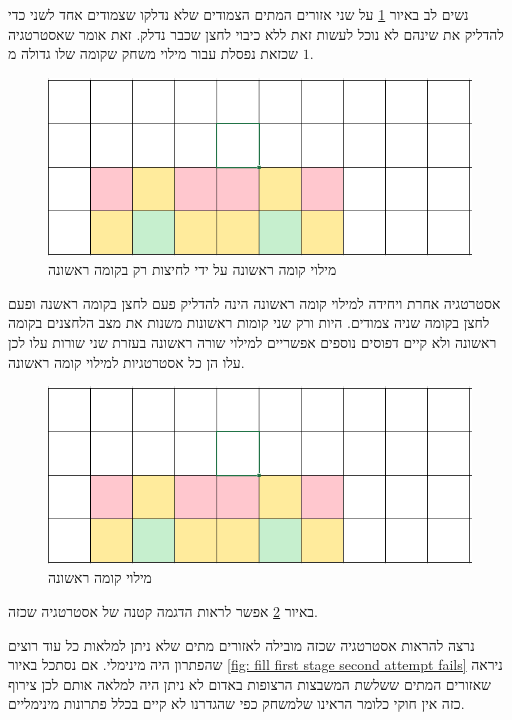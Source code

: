 \documentclass[12pt,twoside]{article}
\begin{document}
נשים לב באיור 
\ref{fig: fill first stage only pressing first stage}
על שני אזורים המתים הצמודים שלא נדלקו שצמודים אחד לשני כדי להדליק את שינהם
לא נוכל לעשות זאת ללא כיבוי לחצן שכבר נדלק.
זאת אומר שאסטרטגיה שכזאת
נפסלת עבור מילוי משחק שקומה שלו גדולה מ
$1$.

\begin{figure}[ht]
    \caption{מילוי קומה ראשונה על ידי לחיצות רק בקומה ראשונה}
    \label{fig: fill first stage only pressing first stage}
    \unsethebrew
    \centering
    \includegraphics[width=.7\textwidth,height=.7\textheight,keepaspectratio]{images/first_stage_fill_only_first_stage_click.PNG}
\end{figure}
\sethebrew

אסטרטגיה אחרת ויחידה למילוי קומה ראשונה הינה להדליק 
פעם לחצן בקומה ראשנה 
ופעם לחצן בקומה שניה צמודים.
היות ורק שני קומות ראשונות משנות את מצב הלחצנים בקומה ראשונה ולא קיים דפוסים נוספים
אפשריים למילוי שורה ראשונה בעזרת שני שורות עלו לכן עלו הן כל אסטרטגיות למילוי קומה ראשונה.

\begin{figure}[ht]
    \caption{מילוי קומה ראשונה}
    \label{fig: fill first stage second attempt}
    \unsethebrew
    \centering
    \includegraphics[width=.7\textwidth,height=.7\textheight,keepaspectratio]{images/first_stage_fill_only_first_stage_click.PNG}
\end{figure}
\sethebrew

באיור 
\ref{fig: fill first stage second attempt}
אפשר לראות הדגמה קטנה של אסטרטגיה שכזה.

נרצה להראות אסטרטגיה שכזה מובילה לאזורים מתים שלא ניתן למלאות 
כל עוד רוצים שהפתרון היה מינימלי.
אם נסתכל באיור 
\ref{fig: fill first stage second attempt fails}
ניראה שאזורים המתים ששלשת
המשבצות הרצופות באדום לא ניתן היה למלאה אותם לכן צירוף כזה אין חוקי
כלומר הראינו שלמשחק כפי שהגדרנו לא קיים בכלל פתרונות מינימליים.
\end{document}
